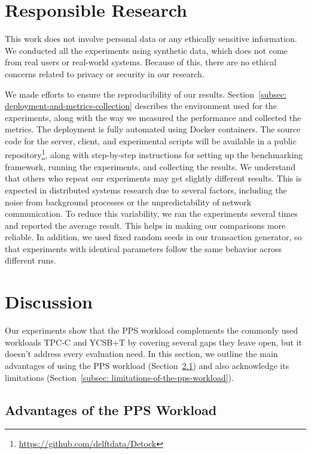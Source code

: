 \documentclass{article}
\begin{document}
\section{Responsible Research}
\label{sec: responsible-research}
This work does not involve personal data or any ethically sensitive information. We conducted all the experiments using synthetic data, which does not come from real users or real-world systems. Because of this, there are no ethical concerns related to privacy or security in our research.

We made efforts to ensure the reproducibility of our results. Section~\ref{subsec: deployment-and-metrics-collection} describes the environment used for the experiments, along with the way we measured the performance and collected the metrics. The deployment is fully automated using Docker containers. The source code for the server, client, and experimental scripts will be available in a public repository\footnote{\url{https://github.com/delftdata/Detock}}, along with step-by-step instructions for setting up the benchmarking framework, running the experiments, and collecting the results. We understand that others who repeat our experiments may get slightly different results. This is expected in distributed systems research due to several factors, including the noise from background processes or the unpredictability of network communication. To reduce this variability, we ran the experiments several times and reported the average result. This helps in making our comparisons more reliable. In addition, we used fixed random seeds in our transaction generator, so that experiments with identical parameters follow the same behavior across different runs.

\section{Discussion}
\label{sec: discussion}
Our experiments show that the PPS workload complements the commonly used workloads TPC-C and YCSB+T by covering several gaps they leave open, but it doesn't address every evaluation need. In this section, we outline the main advantages of using the PPS workload (Section~\ref{subsec: advantages-of-the-pps-workload}) and also acknowledge its limitations (Section~\ref{subsec: limitations-of-the-pps-workload}).

\subsection{Advantages of the PPS Workload}
\label{subsec: advantages-of-the-pps-workload}
\end{document}
